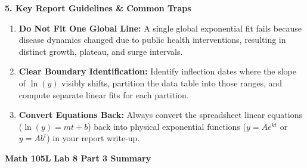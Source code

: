 \documentclass[10.5pt]{article}
\begin{document}
\textbf{\large 5. Key Report Guidelines \& Common Traps}
\begin{enumerate}[leftmargin=1.2em, topsep=1pt, itemsep=2pt]
  \item \textbf{Do Not Fit One Global Line:} A single global exponential fit fails because disease dynamics changed due to public health interventions, resulting in distinct growth, plateau, and surge intervals.
  \item \textbf{Clear Boundary Identification:} Identify inflection dates where the slope of $\ln(y)$ visibly shifts, partition the data table into those ranges, and compute separate linear fits for each partition.
  \item \textbf{Convert Equations Back:} Always convert the spreadsheet linear equations ($\ln(y) = mt + b$) back into physical exponential functions ($y = A e^{kt}$ or $y = A b^t$) in your report write-up.
\end{enumerate}

\vfill
\noindent \textbf{\small Math 105L} \hfill \textbf{\small Lab 8 Part 3 Summary}
\end{document}
